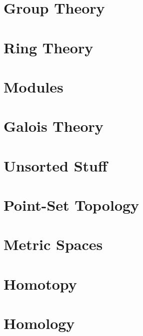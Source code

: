 \documentclass{book}                                                           %
\newcommand*{\TOPPATH}{books}
\newcommand*{\PATH}{\TOPPATH/}
\newcounter{endpage}
\begin{document}
        \part{Group Theory}
            
        \part{Ring Theory}
            
        \part{Modules}
           
        \part{Galois Theory}
            
        \part{Unsorted Stuff}
            
            
            
            
            
    \clearpage

    \setcounter{endpage}{\thepage}
        \label{book:Topology}%
        \renewcommand{\PATH}{\TOPPATH/Topology}
        \setcounter{page}{\value{endpage}}
        \part{Point-Set Topology}
            
            
        \part{Metric Spaces}
        \part{Homotopy}
            
        \part{Homology}
\end{document}
